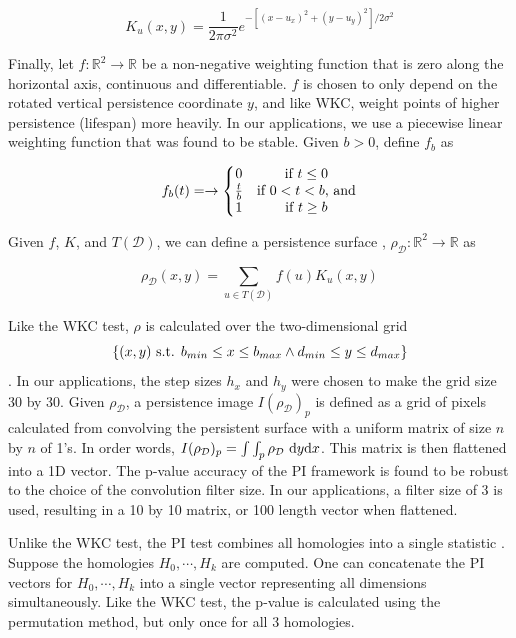 \documentclass[12pt]{article}
\begin{document}
\[ K_{u}(x,y) = \frac{1}{2\pi\sigma^{2}}e^{-[(x - u_{x})^{2} + (y-u_{y})^{2}]/2\sigma^{2}} \]

Finally, let $f : \mathbb{R}^{2} \rightarrow \mathbb{R}$ be a non-negative weighting function that is zero along the horizontal axis, continuous and differentiable. $f$ is chosen to only depend on the rotated vertical persistence coordinate $y$, and like WKC, weight points of higher persistence (lifespan) more heavily. In our applications, we use a piecewise linear weighting function that was found to be stable. Given $b > 0$, define $f_{b}$ as

\[ f_{b}(t) = \rightarrow \left\{\begin{matrix}
0 & \textup{if } t \leq 0 \\ 
\frac{t}{b} & \textup{if } 0 < t < b\textup{, and}\\ 
1 & \textup{if } t \geq b 
\end{matrix}\right. \]

Given $f$, $K$, and $T(\mathcal{D})$, we can define a persistence surface \cite{adams2015persistent}, $\rho_{\mathcal{D}} : \mathbb{R}^{2} \rightarrow \mathbb{R}$ as 

\[ \rho_{\mathcal{D}}(x, y) = \sum_{u \in T(\mathcal{D})} f(u)K_{u}(x,y) \]

Like the WKC test, $\rho$ is calculated over the two-dimensional grid \[ \{ (x, y) \textup{ s.t. } b_{min} \leq x \leq b_{max} \wedge d_{min} \leq y \leq d_{max} \} \]. In our applications, the step sizes $h_{x}$ and $h_{y}$ were chosen to make the grid size 30 by 30. Given $\rho_{\mathcal{D}}$, a persistence image \cite{adams2015persistent} $I(\rho_{\mathcal{D}})_{p}$ is defined as a grid of pixels calculated from convolving the persistent surface with a uniform matrix of size $n$ by $n$ of 1's. In order words, $I(\rho_{\mathcal{D}})_{p} = \int\int_{p} \rho_{\mathcal{D}} \textup{ d}y\textup{d}x$. This matrix is then flattened into a 1D vector.  The p-value accuracy of the PI framework is found to be robust to the choice of the convolution filter size. In our applications, a filter size of 3 is used, resulting in a 10 by 10 matrix, or 100 length vector when flattened.

Unlike the WKC test, the PI test combines all homologies into a single statistic \cite{adams2015persistent}. Suppose the homologies $H_{0}, \cdots, H_{k}$ are computed. One can concatenate the PI vectors for $H_{0}, \cdots, H_{k}$ into a single vector representing all dimensions simultaneously. Like the WKC test, the p-value is calculated using the permutation method, but only once for all 3 homologies.
\end{document}
